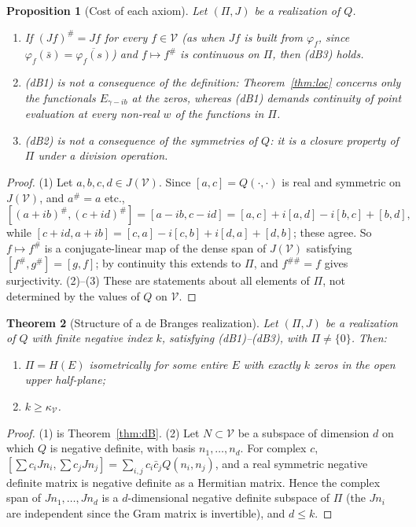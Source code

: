\documentclass[11pt]{amsart}
\newtheorem{theorem}{Theorem}[section]
\newtheorem{proposition}[theorem]{Proposition}
\theoremstyle{definition}
\theoremstyle{remark}
\newcommand{\kV}{\kappa_{\mathcal V}}
\begin{document}
\begin{proposition}[Cost of each axiom]\label{prop:auto}
Let $(\Pi,J)$ be a realization of $Q$.
\begin{enumerate}
\item If $(Jf)^\#=Jf$ for every $f\in\mathcal V$ \textnormal{(}as when $Jf$ is built from
$\varphi_f$, since $\varphi_f(\bar s)=\overline{\varphi_f(s)}$\textnormal{)} and $f\mapsto
f^\#$ is continuous on $\Pi$, then \textnormal{(dB3)} holds.
\item \textnormal{(dB1)} is not a consequence of the definition: Theorem~\ref{thm:loc} concerns only
the functionals $E_{\gamma-ib}$ at the zeros, whereas \textnormal{(dB1)} demands continuity of
point evaluation at every non-real $w$ of the functions in $\Pi$.
\item \textnormal{(dB2)} is not a consequence of the symmetries of $Q$: it is a closure property of
$\Pi$ under a division operation.
\end{enumerate}
\end{proposition}
\begin{proof}
(1) Let $a,b,c,d\in J(\mathcal V)$. Since $[a,c]=Q(\cdot,\cdot)$ is real and symmetric on
$J(\mathcal V)$, and $a^\#=a$ etc.,
\[
[(a+ib)^\#,(c+id)^\#]=[a-ib,c-id]=[a,c]+i[a,d]-i[b,c]+[b,d],
\]
while $[c+id,a+ib]=[c,a]-i[c,b]+i[d,a]+[d,b]$; these agree. So $f\mapsto f^\#$ is a
conjugate-linear map of the dense span of $J(\mathcal V)$ satisfying $[f^\#,g^\#]=[g,f]$; by
continuity this extends to $\Pi$, and $f^{\#\#}=f$ gives surjectivity. (2)--(3) These are
statements about all elements of $\Pi$, not determined by the values of $Q$ on $\mathcal V$.
\end{proof}

\begin{theorem}[Structure of a de Branges realization]\label{thm:rigid}
Let $(\Pi,J)$ be a realization of $Q$ with finite negative index $k$, satisfying
\textnormal{(dB1)--(dB3)}, with $\Pi\neq\{0\}$. Then:
\begin{enumerate}
\item $\Pi=H(E)$ isometrically for some entire $E$ with exactly $k$ zeros in the open upper
half-plane;
\item $k\ge\kV$.
\end{enumerate}
\end{theorem}
\begin{proof}
(1) is Theorem~\ref{thm:dB}. (2) Let $N\subset\mathcal V$ be a subspace of dimension $d$ on which
$Q$ is negative definite, with basis $n_1,\dots,n_d$. For complex $c$,
$[\sum c_iJn_i,\sum c_jJn_j]=\sum_{i,j}c_i\bar c_jQ(n_i,n_j)$, and a real symmetric negative
definite matrix is negative definite as a Hermitian matrix. Hence the complex span of
$Jn_1,\dots,Jn_d$ is a $d$-dimensional negative definite subspace of $\Pi$ (the $Jn_i$ are
independent since the Gram matrix is invertible), and $d\le k$.
\end{proof}
\end{document}

